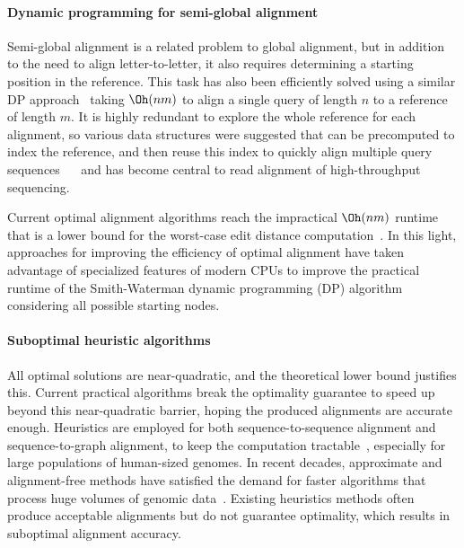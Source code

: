 \paragraph{Dynamic programming for semi-global alignment}
Semi-global alignment is a related problem to global alignment, but in addition
to the need to align letter-to-letter, it also requires determining a starting
position in the reference. This task has also been efficiently solved using a
similar DP approach~\cite{sellers1980theory,smith1981identification} taking
$\Oh(nm)$ to align a single query of length $n$ to a reference of length $m$. It
is highly redundant to explore the whole reference for each alignment, so
various data structures were suggested that can be precomputed to index the
reference, and then reuse this index to quickly align multiple query sequences
~\citeyear{pearson1988improved}~\cite{pearson1988improved} and has become
central to read alignment of high-throughput sequencing.

Current optimal alignment algorithms reach the impractical $\Oh(nm)$ runtime
that is a lower bound for the worst-case edit distance
computation~\cite{backurs2015edit}. In this light, approaches for improving the
efficiency of optimal alignment have taken advantage of specialized features of
modern CPUs to improve the practical runtime of the Smith-Waterman dynamic
programming (DP) algorithm~\cite{smith_comparison_1981} considering all possible
starting nodes.

\paragraph{Suboptimal heuristic algorithms}
All optimal solutions are near-quadratic, and the theoretical lower bound
justifies this. Current practical algorithms break the optimality guarantee to
speed up beyond this near-quadratic barrier, hoping the produced alignments are
accurate enough. Heuristics are employed for both sequence-to-sequence alignment
and sequence-to-graph alignment, to keep the computation
tractable~\cite{altschul_basic_1990,langmead_fast_2012,garrison_variation_2018},
especially for large populations of human-sized genomes. In recent decades,
approximate and alignment-free methods have satisfied the demand for faster
algorithms that process huge volumes of genomic
data~\cite{kucherov2019evolution}. Existing heuristics methods often produce
acceptable alignments but do not guarantee optimality, which results in
suboptimal alignment accuracy.

